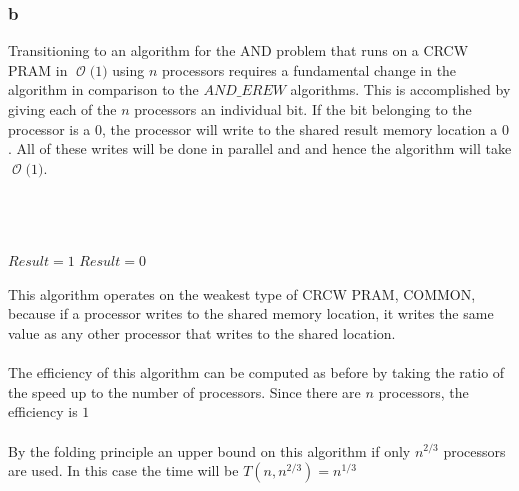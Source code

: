 \documentclass[12pt]{article}
\newcommand{\BigO}[1]{\ensuremath{\operatorname{\mathcal{O}}\bigl(#1\bigr)}}
\begin{document}
\subsubsection*{b}
Transitioning to an algorithm for the AND problem that runs on a CRCW PRAM in
\BigO{1} using $n$ processors requires a fundamental change in the algorithm
in comparison to the $AND\_EREW$ algorithms.  This is accomplished by 
giving each of the $n$ processors an individual bit.  If the bit belonging to
the processor is a $0$, the processor will write to the shared result memory
location a $0$.  All of these writes will be done in parallel and and hence
the algorithm will take \BigO{1}.\\\\
\begin{algorithm}[H]
\\
\\
$Result = 1$
{$Result=0$}
\end{algorithm}
This algorithm operates on the weakest type of CRCW PRAM, COMMON, because if a processor
writes to the shared memory location, it writes the same value as any other
processor that writes to the shared location.\\\\
The efficiency of this algorithm can be computed as before by taking
the ratio of the speed up to the number of processors.  Since there are
$n$ processors, the efficiency is $1$\\\\
By the folding principle an upper bound on this algorithm if only $n^{2/3}$
processors are used.  In this case the time will be $T(n, n^{2/3}) = n^{1/3}$   
\end{document}

